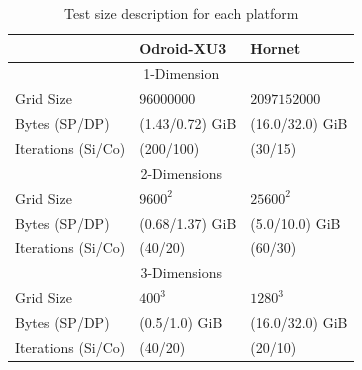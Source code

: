 \documentclass{acm_proc_article-sp}
\begin{document}
\begin{table}[ht]
  \begin{center}
    \begin{tabular}{| l | l | l |} \hline
                         & Odroid-XU3      & Hornet          \\ \hline
      \multicolumn{3}{|c|}{1-Dimension}                      \\ \hline
      Grid Size          & $96000000$      & $2097152000$    \\ \hline
      Bytes (SP/DP)      & (1.43/0.72) GiB & (16.0/32.0) GiB \\ \hline
      Iterations (Si/Co) & (200/100)       & (30/15)         \\ \hline
      \multicolumn{3}{|c|}{2-Dimensions}                     \\ \hline
      Grid Size          & $9600^2$        & $25600^2$        \\ \hline
      Bytes (SP/DP)      & (0.68/1.37) GiB & (5.0/10.0) GiB  \\ \hline
      Iterations (Si/Co) & (40/20)         & (60/30)          \\ \hline
      \multicolumn{3}{|c|}{3-Dimensions}                     \\ \hline
      Grid Size          & $400^3$         & $1280^3$         \\ \hline
      Bytes (SP/DP)      & (0.5/1.0) GiB   & (16.0/32.0) GiB \\ \hline
      Iterations (Si/Co) & (40/20)         & (20/10)         \\ \hline
    \end{tabular}
    \caption{Test size description for each platform}
    \label{tbl:problem}
  \end{center}
\end{table}
\end{document}
